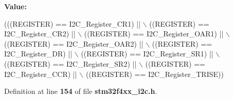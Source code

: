 {\bfseries Value\+:}
\begin{DoxyCode}
(((REGISTER) == I2C_Register_CR1) || \(\backslash\)
                                   ((REGISTER) == I2C_Register_CR2) || \(\backslash\)
                                   ((REGISTER) == I2C_Register_OAR1) || \(\backslash\)
                                   ((REGISTER) == I2C_Register_OAR2) || \(\backslash\)
                                   ((REGISTER) == I2C_Register_DR) || \(\backslash\)
                                   ((REGISTER) == I2C_Register_SR1) || \(\backslash\)
                                   ((REGISTER) == I2C_Register_SR2) || \(\backslash\)
                                   ((REGISTER) == I2C_Register_CCR) || \(\backslash\)
                                   ((REGISTER) == I2C_Register_TRISE))
\end{DoxyCode}


Definition at line \textbf{ 154} of file \textbf{ stm32f4xx\+\_\+i2c.\+h}.

